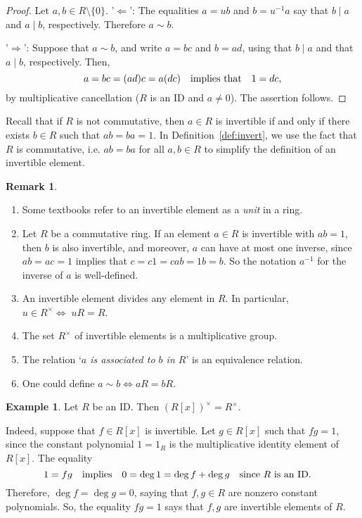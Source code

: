 \documentclass[12pt]{article}
\newcommand{\qbox}[1]{\quad\hbox{#1}\quad}
\theoremstyle{definition}
\newtheorem{example}[thm]{Example}
\newtheorem{remark}[thm]{Remark}
\newcounter{ex}\renewcommand\theex{\arabic{ex}}
\begin{document}
\begin{proof} Let $a,b\in R\setminus\{0\}$.
'$\Leftarrow$': The equalities $a=ub$ and $b=u^{-1}a$ say that 
$b\mid a$ and $a\mid b$, respectively. Therefore $a\sim b$. 

'$\Rightarrow$': Suppose that $a\sim b$, and write $a=bc$ and $b=ad$,
using that $b\mid a$ and that $a\mid b$, respectively.
Then,
$$a=bc=(ad)c=a(dc)\qbox{implies that}1=dc,$$
by multiplicative cancellation ($R$ is an ID and $a\neq0$). The
assertion follows. 
\end{proof}

\smallskip

Recall that if $R$ is not commutative, then $a\in R$ is invertible if
and only if there exists $b\in R$ such that $ab=ba=1$. In 
Definition~\ref{def:invert}, we use the fact that $R$ is commutative,
i.e. $ab=ba$ for all $a,b\in R$ to simplify the definition of an
invertible element.

\begin{remark}\label{rem:elts}\

\begin{enumerate}\item
Some textbooks refer to an invertible element as a
{\em unit} in a ring.
\item Let $R$ be a commutative ring. If an element $a\in R$ is
invertible with $ab=1$, then $b$ is also invertible, and moreover, $a$
can have at most one inverse, since $ab=ac=1$ implies that
$c=c1=cab=1b=b$. So the notation $a^{-1}$ for the inverse of $a$ is
well-defined.
\item An invertible element divides any element in $R$.
In particular, $u\in R^\times\Longleftrightarrow\;uR=R$.
\item The set $R^\times$ of invertible elements is a multiplicative
group. 
\item The relation `{\em $a$ is associated to $b$ in $R$}' is an 
equivalence relation.
\item One could define
$a\sim b\Longleftrightarrow aR=bR$.
\end{enumerate}
\end{remark}

\begin{example}\label{ex:invert-field}
Let $R$ be an ID. Then $(R[x])^\times=R^\times$.

Indeed, suppose that $f\in R[x]$ is invertible. Let $g\in R[x]$ such
that $fg=1$, since the constant polynomial $1=1_R$ is the
multiplicative identity element of $R[x]$. The equality
$$1=fg\qbox{implies}0=\deg1=\deg f+\deg g\qbox{since $R$ is an ID.}$$
Therefore, $\deg f=\deg g=0$, saying that $f,g\in R$ are nonzero
constant polynomials. So, the equality $fg=1$ says that $f,g$ are
invertible elements of $R$.
\end{example}
\end{document}
